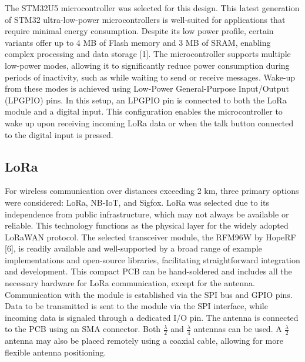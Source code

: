 The STM32U5 microcontroller was selected for this design. This latest generation of STM32 ultra-low-power microcontrollers is well-suited for applications that require minimal energy consumption.
Despite its low power profile, certain variants offer up to 4 MB of Flash memory and 3 MB of SRAM, enabling complex processing and data storage [1].
The microcontroller supports multiple low-power modes, allowing it to significantly reduce power consumption during periods of inactivity, such as while waiting to send or receive messages.
Wake-up from these modes is achieved using Low-Power General-Purpose Input/Output (LPGPIO) pins.
In this setup, an LPGPIO pin is connected to both the LoRa module and a digital input. This configuration enables the microcontroller to wake up upon receiving incoming LoRa data or when the talk button connected to the digital input is pressed.

\subsection{LoRa}


For wireless communication over distances exceeding 2 km, three primary options were considered: LoRa, NB-IoT, and Sigfox. LoRa was selected due to its independence from public infrastructure, which may not always be available or reliable. This technology functions as the physical layer for the widely adopted LoRaWAN protocol. The selected transceiver module, the RFM96W by HopeRF [6], is readily available and well-supported by a broad range of example implementations and open-source libraries, facilitating straightforward integration and development.
This compact PCB can be hand-soldered and includes all the necessary hardware for LoRa communication, except for the antenna.
Communication with the module is established via the SPI bus and GPIO pins.
Data to be transmitted is sent to the module via the SPI interface, while incoming data is signaled through a dedicated I/O pin.
The antenna is connected to the PCB using an SMA connector. Both $\frac{\lambda}{2}$ and $\frac{\lambda}{4}$ antennas can be used.
A $\frac{\lambda}{2}$ antenna may also be placed remotely using a coaxial cable, allowing for more flexible antenna positioning.

